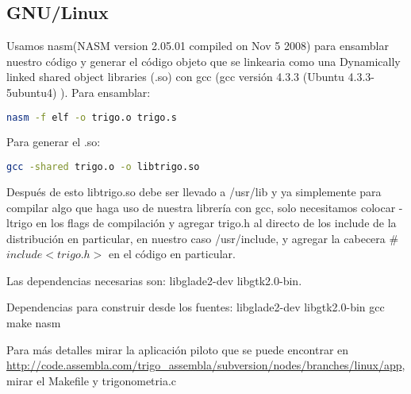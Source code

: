 \subsection{GNU/Linux}

Usamos nasm(NASM version 2.05.01 compiled on Nov  5 2008) para ensamblar nuestro código y generar el código objeto que se linkearia como una  Dynamically linked shared object libraries (.so)  con gcc (gcc versión 4.3.3 (Ubuntu 4.3.3-5ubuntu4) ).
Para ensamblar:
\begin{lstlisting}[language=bash]
nasm -f elf -o trigo.o trigo.s 
\end{lstlisting}
Para generar el .so:
\begin{lstlisting}[language=bash]
gcc -shared trigo.o -o libtrigo.so
\end{lstlisting}
Después de esto libtrigo.so debe ser llevado a /usr/lib y ya simplemente para compilar algo que haga uso de nuestra librería con gcc, solo necesitamos colocar -ltrigo en los flags de compilación y agregar trigo.h al directo de los include de la distribución en particular, en nuestro caso /usr/include, y agregar la cabecera \#$include<trigo.h>$ en el código en particular.

Las dependencias necesarias son: libglade2-dev libgtk2.0-bin.

Dependencias para construir desde los fuentes: libglade2-dev libgtk2.0-bin gcc make nasm

Para más detalles mirar la aplicación piloto que se puede encontrar en \url{http://code.assembla.com/trigo_assembla/subversion/nodes/branches/linux/app}, mirar el Makefile y trigonometria.c

